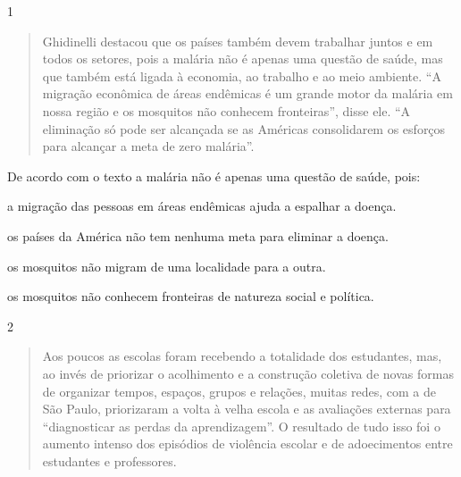 

\num{1}

\begin{quote}
Ghidinelli destacou que os países também devem trabalhar juntos e em
todos os setores, pois a malária não é apenas uma questão de saúde, mas
que também está ligada à economia, ao trabalho e ao meio ambiente. ``A
migração econômica de áreas endêmicas é um grande motor da malária em
nossa região e os mosquitos não conhecem fronteiras'', disse ele. ``A
eliminação só pode ser alcançada se as Américas consolidarem os esforços
para alcançar a meta de zero malária''.
\end{quote}


De acordo com o texto a malária não é apenas uma questão de saúde, pois:

\begin{escolha}

  \item a migração das pessoas em áreas endêmicas ajuda a espalhar a doença.

  \item os países da América não tem nenhuma meta para eliminar a doença.

  \item os mosquitos não migram de uma localidade para a outra. 

  \item os mosquitos não conhecem fronteiras de natureza social e política.

\end{escolha}

\num{2}

\begin{quote}
Aos poucos as escolas foram recebendo a totalidade dos estudantes, mas,
ao invés de priorizar o acolhimento e a construção coletiva de novas
formas de organizar tempos, espaços, grupos e relações, muitas redes,
com a de São Paulo, priorizaram a volta à velha escola e as avaliações
externas para ``diagnosticar as perdas da aprendizagem''. O resultado de
tudo isso foi o aumento intenso dos episódios de violência escolar e de
adoecimentos entre estudantes e professores.
\end{quote}

